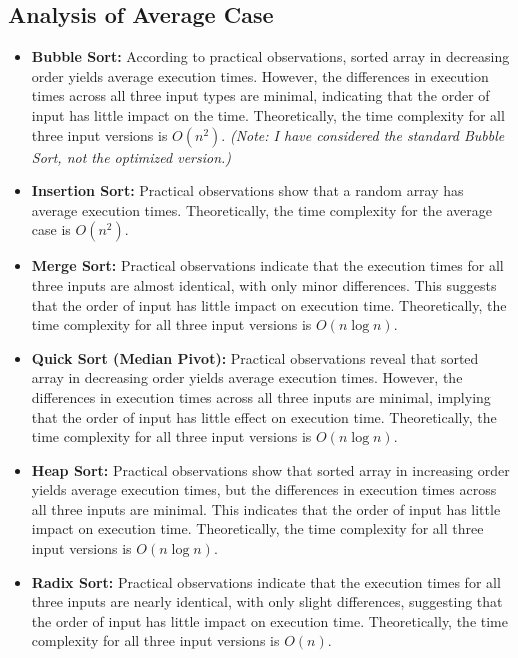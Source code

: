 \documentclass[a4paper,12pt]{report}
\begin{document}
\subsection{Analysis of Average Case}
\begin{itemize}
    \item \textbf{Bubble Sort:} According to practical observations, sorted array in decreasing order yields average execution times. However, the differences in execution times across all three input types are minimal, indicating that the order of input has little impact on the time. Theoretically, the time complexity for all three input versions is \(O(n^2)\). \emph{(Note: I have considered the standard Bubble Sort, not the optimized version.)}
    
    \item \textbf{Insertion Sort:} Practical observations show that a random array has average execution times. Theoretically, the time complexity for the average case is \( O(n^2) \).
    
    \item \textbf{Merge Sort:} Practical observations indicate that the execution times for all three inputs are almost identical, with only minor differences. This suggests that the order of input has little impact on execution time. Theoretically, the time complexity for all three input versions is \(O(n \log n)\).
    
    \item \textbf{Quick Sort (Median Pivot):} Practical observations reveal that sorted array in decreasing order yields average execution times. However, the differences in execution times across all three inputs are minimal, implying that the order of input has little effect on execution time. Theoretically, the time complexity for all three input versions is \(O(n \log n)\).
    
    \item \textbf{Heap Sort:} Practical observations show that sorted array in increasing order yields average execution times, but the differences in execution times across all three inputs are minimal. This indicates that the order of input has little impact on execution time. Theoretically, the time complexity for all three input versions is \(O(n \log n)\).
    
    \item \textbf{Radix Sort:} Practical observations indicate that the execution times for all three inputs are nearly identical, with only slight differences, suggesting that the order of input has little impact on execution time. Theoretically, the time complexity for all three input versions is \(O(n)\).
\end{itemize}
\end{document}
